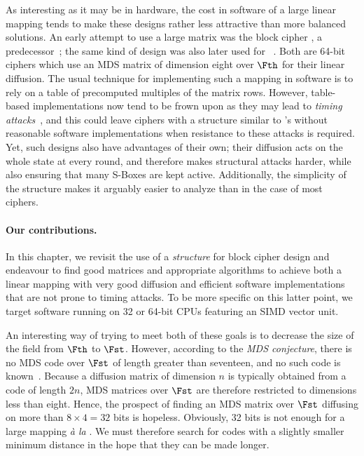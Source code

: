 As interesting as it may be in hardware, the cost in software of a large linear mapping tends to make these designs rather less attractive than more balanced solutions.
An early attempt to use a large matrix was the block cipher \shark{}, a \rijndael{} predecessor~\cite{shark}; the same kind of design
was also later used for \khazad~\cite{khazad}. Both are  64-bit ciphers which use an MDS matrix of dimension
eight over $\Fth$ for their linear diffusion. The usual technique for implementing such a mapping in software is to rely on a table of precomputed multiples of
the matrix rows. However, table-based implementations now tend to be frown upon as they may lead to \emph{timing attacks}~\cite{timinattacks}, and this could
leave ciphers with a structure similar to \shark{}'s without reasonable software implementations when resistance to these attacks is required.
Yet, such designs also have advantages of their own; their diffusion acts on the whole state at every round, and therefore makes structural attacks harder,
while also ensuring that many S-Boxes are kept active.
Additionally, the simplicity of the structure makes it arguably easier to analyze than in the case of most ciphers.

\paragraph{Our contributions.}

In this chapter, we revisit the use of a \emph{\shark{} structure} for block cipher design and endeavour to find good matrices and appropriate algorithms
to achieve both a linear mapping with very good diffusion and efficient software implementations that are not prone to timing attacks.
To be more specific on this latter point, we target software running on 32 or 64-bit CPUs featuring an SIMD vector unit.

An interesting way of trying to meet both of these goals is to decrease the size of the field from $\Fth$ to $\Fst$. However, according to the \emph{MDS conjecture},
there is no MDS code over $\Fst$ of length greater than seventeen, and no such code is known~\cite{mdsConj}. Because a diffusion matrix of dimension $n$ is typically
obtained from a code of length $2n$, MDS matrices over $\Fst$ are therefore restricted to dimensions less than eight. Hence, the prospect
of finding an MDS matrix over $\Fst$ diffusing on more than $8\times4 = 32$ bits is hopeless.
Obviously,
32 bits is not enough for a large mapping \emph{à la} \shark{}. We must therefore search for codes with a slightly smaller minimum distance
in the hope that they can be made longer.

